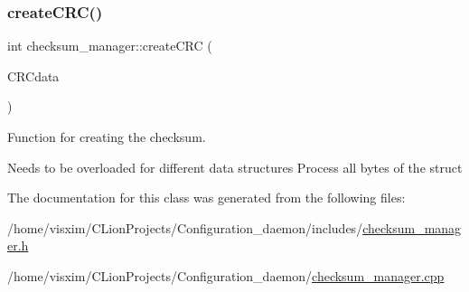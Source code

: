 \subsubsection{\texorpdfstring{create\+C\+R\+C()}{createCRC()}\hspace{0.1cm}{\footnotesize\ttfamily [2/2]}}
{\footnotesize\ttfamily int checksum\+\_\+manager\+::create\+C\+RC (\begin{DoxyParamCaption}\item[{\hyperlink{structEXMPLE__s}{E\+X\+M\+P\+L\+E\+\_\+s} $\ast$}]{C\+R\+Cdata }\end{DoxyParamCaption})}



Function for creating the checksum. 

Needs to be overloaded for different data structures Process all bytes of the struct 

The documentation for this class was generated from the following files\+:\begin{DoxyCompactItemize}
\item 
/home/visxim/\+C\+Lion\+Projects/\+Configuration\+\_\+daemon/includes/\hyperlink{checksum__manager_8h}{checksum\+\_\+manager.\+h}\item 
/home/visxim/\+C\+Lion\+Projects/\+Configuration\+\_\+daemon/\hyperlink{checksum__manager_8cpp}{checksum\+\_\+manager.\+cpp}\end{DoxyCompactItemize}
